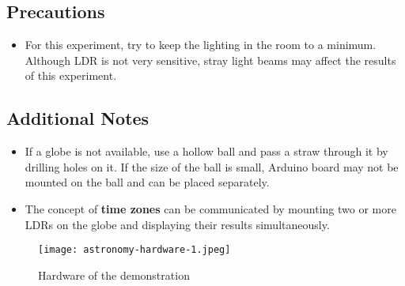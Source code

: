 \subsection*{Precautions}
\begin{itemize}[leftmargin=*]
\item For this experiment, try to keep the lighting in the room to a minimum. Although LDR is not very sensitive, stray light beams may affect the results of this experiment.
\end{itemize}

\subsection*{Additional Notes}
\begin{itemize}[leftmargin=*]
\item If a globe is not available, use a hollow ball and pass a straw through it by drilling holes on it. If the size of the ball is small, Arduino board may not be mounted on the ball and can be placed separately.  
\item The concept of \textbf{time zones} can be communicated by mounting two or more LDRs on the globe and displaying their results simultaneously.
 \end{itemize}

\begin{figure}[!ht]
\centering\texttt{[image: astronomy-hardware-1.jpeg]}
\caption{Hardware of the demonstration}
\end{figure}